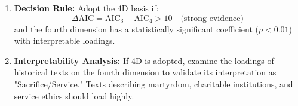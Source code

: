 \documentclass[11pt,a4paper]{article}
\theoremstyle{definition}
\theoremstyle{remark}
\begin{document}
\begin{enumerate}
    \item \textbf{Decision Rule:} Adopt the 4D basis if:
    \begin{equation}
        \Delta \text{AIC} = \text{AIC}_3 - \text{AIC}_4 > 10 \quad \text{(strong evidence)}
    \end{equation}
    and the fourth dimension has a statistically significant coefficient (\(p < 0.01\)) with interpretable loadings.
    
    \item \textbf{Interpretability Analysis:} If 4D is adopted, examine the loadings of historical texts on the fourth dimension to validate its interpretation as "Sacrifice/Service." Texts describing martyrdom, charitable institutions, and service ethics should load highly.
\end{enumerate}
\end{document}
